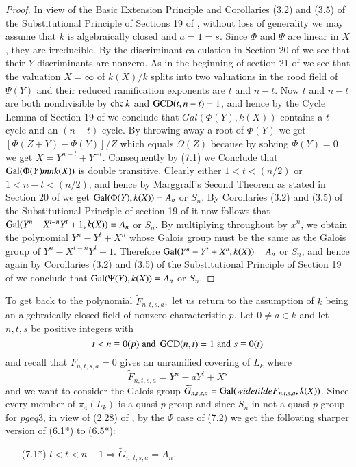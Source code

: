 \noindent
\begin{proof} In view of the Basic Extension Principle and Corollaries (3.2) and (3.5) of the Substitutional Principle of Sections 19 of \cite{art1-key8}, without loss of generality we may assume that $k$ is algebraically closed and $a=1 =s$. Since $\Phi$ and $\Psi$ are linear in $X$, they are irreducible. By the discriminant calculation in Section 20 of \cite{art1-key8} we see that their $Y$-discriminants are nonzero. As in the beginning of section 21 of \cite{art1-key8} we see that the valuation $X=\infty$ of $k(X)/k$ splits into two valuations in the rood field of $\Psi(Y)$ and their reduced  ramification exponents are $t$ and $n-t$. Now $t$ and $n-t$ are both nondivisible by $\operatorname{chc} k$ and $\operatorname{GCD}(t,n-t)=1$, and hence by the Cycle Lemma of Section 19 of \cite{art1-key8} we conclude that $Gal(\Phi(Y), k(X))$ contains a $t$-cycle and an $(n-t)$-cycle. By throwing away a root of $\Phi(Y)$ we get $\left[\Phi(Z+Y)-\Phi(Y)\right]/Z$ which equals $\Omega(Z)$ because by solving $\Phi(Y)=0$ we get $X=Y^{n-t}+Y^{-t}$. Consequently by (7.1) we Conclude that $\operatorname{Gal}(\Phi(Y)mn k(X))$ is double transitive. Clearly either $1<t<(n/2)$ or $1<n-t<(n/2)$, and hence by Marggraff's Second Theorem as stated in Section 20 of \cite{art1-key8} we get $\operatorname{Gal}(\Phi(Y), k(X)) = A_{n}$ or $S_{n}$. By Corollaries (3.2) and (3.5) of the Substitutional Principle of section 19 of \cite{art1-key8} it now follows that $\operatorname{Gal}(Y^{n}-X^{t-n}Y^{t}+1, k(X))=A_{n}$ or $S_{n}$. By multiplying throughout by $x^{n}$, we obtain the polynomial $Y^{n}-Y^{t}+X^{n}$ whose Galois group must be the same as the Galois group of $Y^{n}-X^{t-n}Y^{t}+1$. Therefore $\operatorname{Gal}(Y^{n}-Y^{t}+X^{n}, k(X))=A_{n}$ or $S_{n}$, and hence again by Corollaries (3.2) and (3.5) of the Substitutional Principle of Section 19 of \cite{art1-key8} we conclude that $\operatorname{Gal}(\Psi(Y), k(X)) =A_{n}$ or $S_{n}$.  
\end{proof}

To get back to the polynomial $\widetilde{F}_{n,t,s,a},$ let us return to the assumption of $k$ being an algebraically closed field of nonzero characteristic $p$. Let $0\neq a \in k$ and let $n, t, s$ be positive integers with
$$
t < n \equiv 0(p)\; {\rm and}\; \operatorname{GCD}(n,t) = 1\; {\rm and}\; s\equiv 0(t)
$$
and recall that $\widetilde{F}_{n,t,s,a} = 0$ gives an unramified covering of $L_{k}$ where
$$
\widetilde{F}_{n,t,s,a} =Y^{n}-aY^{t}+X^{s}
$$
and we want to consider the Galois group $\widetilde{G}_{n,t,s,a} = \Gal(widetilde{F}_{n,t,s,a},\break k(X))$. Since every member of $\pi_{4}(L_{k})$ is a quasi $p$-group and since $S_{n}$ in not a quasi $p$-group for $p geq 3$, in view of (2.28) of \cite{art1-key14}, by the $\Psi$ case of (7.2) we get the following sharper version of (6.1*) to (6.5*):
\begin{itemize}
\item[{\rm (7.1*)}] $l < t < n-1 \Rightarrow \widetilde{G}_{n,t,s,a} =A_{n}$.
\end{itemize}

